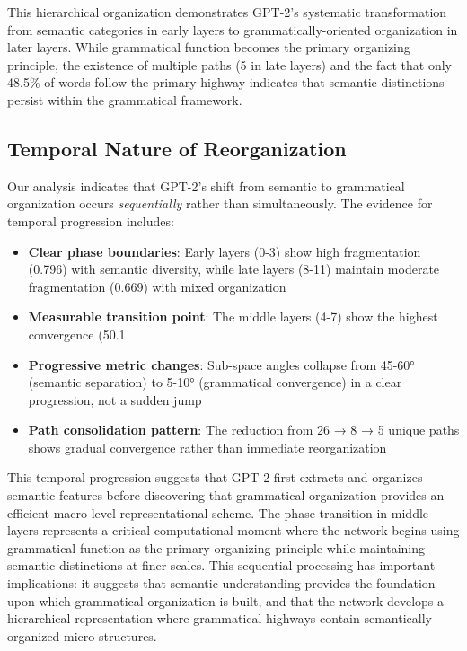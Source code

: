 This hierarchical organization demonstrates GPT-2's systematic transformation from semantic categories in early layers to grammatically-oriented organization in later layers. While grammatical function becomes the primary organizing principle, the existence of multiple paths (5 in late layers) and the fact that only 48.5\% of words follow the primary highway indicates that semantic distinctions persist within the grammatical framework.

\subsection{Temporal Nature of Reorganization}

Our analysis indicates that GPT-2's shift from semantic to grammatical organization occurs \textit{sequentially} rather than simultaneously. The evidence for temporal progression includes:

\begin{itemize}
    \item \textbf{Clear phase boundaries}: Early layers (0-3) show high fragmentation (0.796) with semantic diversity, while late layers (8-11) maintain moderate fragmentation (0.669) with mixed organization
    \item \textbf{Measurable transition point}: The middle layers (4-7) show the highest convergence (50.1%
    \item \textbf{Progressive metric changes}: Sub-space angles collapse from 45-60° (semantic separation) to 5-10° (grammatical convergence) in a clear progression, not a sudden jump
    \item \textbf{Path consolidation pattern}: The reduction from 26 → 8 → 5 unique paths shows gradual convergence rather than immediate reorganization
\end{itemize}

This temporal progression suggests that GPT-2 first extracts and organizes semantic features before discovering that grammatical organization provides an efficient macro-level representational scheme. The phase transition in middle layers represents a critical computational moment where the network begins using grammatical function as the primary organizing principle while maintaining semantic distinctions at finer scales. This sequential processing has important implications: it suggests that semantic understanding provides the foundation upon which grammatical organization is built, and that the network develops a hierarchical representation where grammatical highways contain semantically-organized micro-structures.


